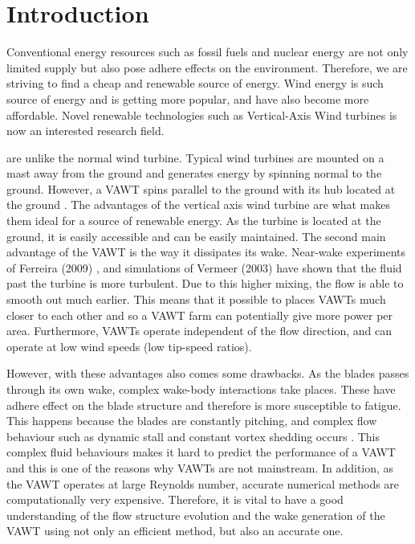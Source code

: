 \chapter{Introduction}
\label{ch:Introduction}

Conventional energy resources such as fossil fuels and nuclear energy are not only limited supply but also pose adhere effects on the environment. Therefore, we are striving to find a cheap and renewable source of energy. Wind energy is such source of energy and is getting more popular, and have also become more affordable. Novel renewable technologies such as Vertical-Axis Wind turbines is now an interested research field.

 are unlike the normal wind turbine. Typical wind turbines are mounted on a mast away from the ground and generates energy by spinning normal to the ground. However, a VAWT spins parallel to the ground with its hub located at the ground \cite{website:wikiVAWT}. The advantages of the vertical axis wind turbine are what makes them ideal for a source of renewable energy.  As the turbine is located at the ground, it is easily accessible and can be easily maintained. The second main advantage of the VAWT is the way it dissipates its wake. Near-wake experiments of Ferreira (2009) \cite{Ferreira}, and simulations of Vermeer (2003) \cite{Vermeer2003} have shown that the fluid past the turbine is more turbulent. Due to this higher mixing, the flow is able to smooth out much earlier. This means that it possible to places VAWTs much closer to each other and so a VAWT farm can potentially give more power per area. Furthermore, VAWTs operate independent of the flow direction, and can operate at low wind speeds (low tip-speed ratios).

However, with these advantages also comes some drawbacks. As the blades passes through its own wake, complex wake-body interactions take places. These have adhere effect on the blade structure and therefore is more susceptible to fatigue. This happens because the blades are constantly pitching, and complex flow behaviour such as dynamic stall and constant vortex shedding occurs \cite{SimaoFerreira2008}. This complex fluid behaviours makes it hard to predict the performance of a VAWT and this is one of the reasons why VAWTs are not mainstream. In addition, as the VAWT operates at large Reynolds number, accurate numerical methods are computationally very expensive. Therefore, it is vital to have a good understanding of the flow structure evolution and the wake generation of the VAWT using not only an efficient method, but also an accurate one.

